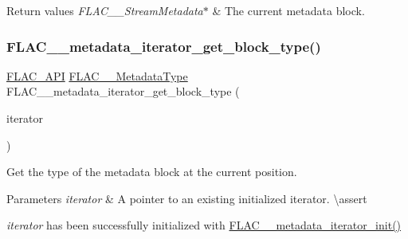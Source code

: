 \begin{DoxyRetVals}{Return values}
{\em F\+L\+A\+C\+\_\+\+\_\+\+Stream\+Metadata$\ast$} & The current metadata block. \\
\hline
\end{DoxyRetVals}
\mbox{\label{group__flac__metadata__level2_ga8221ea86b62119785c774aaece48a29b}} 
\subsubsection{\texorpdfstring{FLAC\_\_metadata\_iterator\_get\_block\_type()}{FLAC\_\_metadata\_iterator\_get\_block\_type()}}
{\footnotesize\ttfamily \mbox{\hyperlink{group__flac__export_ga56ca07df8a23310707732b1c0007d6f5}{F\+L\+A\+C\+\_\+\+A\+PI}} \mbox{\hyperlink{group__flac__format_gac71714ba8ddbbd66d26bb78a427fac01}{F\+L\+A\+C\+\_\+\+\_\+\+Metadata\+Type}} F\+L\+A\+C\+\_\+\+\_\+metadata\+\_\+iterator\+\_\+get\+\_\+block\+\_\+type (\begin{DoxyParamCaption}\item[{const \mbox{\hyperlink{group__flac__metadata__level2_ga9f3e135a07cdef7e51597646aa7b89b2}{F\+L\+A\+C\+\_\+\+\_\+\+Metadata\+\_\+\+Iterator}} $\ast$}]{iterator }\end{DoxyParamCaption})}

Get the type of the metadata block at the current position.


\begin{DoxyParams}{Parameters}
{\em iterator} & A pointer to an existing initialized iterator. \textbackslash{}assert 
\begin{DoxyCode}{1}
\end{DoxyCode}
 {\itshape iterator} has been successfully initialized with \mbox{\hyperlink{group__flac__metadata__level2_ga4a5af69a1f19436b02f738eb8c97c959}{F\+L\+A\+C\+\_\+\+\_\+metadata\+\_\+iterator\+\_\+init()}} \\
\hline
\end{DoxyParams}

